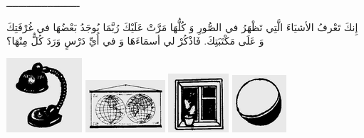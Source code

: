 \documentclass[a5paper]{article}
\begin{document}
ـــــــــــــــــــــــــ

إِنكَ تَعْرفُ الأشيَاءَ الَّتِي تَظْهَرُ في الصُّورِ وَ كُلُّهَا مَرَّتْ عَلَيْكَ رُبَّمَا يُوجَدُ بَعْضُهَا في غُرْفَتِكَ وَ عَلَى مَكْتَبَتِكَ. فَاذْكُرْ لي أسمَاءَهَا وَ في أَيِّ دَرْسٍ وَرَدَ كُلٌّ مِنْهَا؟

 \includegraphics[width=1.1043in,height=1.0937in]{MuhammadBagauddinlatinized-img311.png}   \includegraphics[width=1.1665in,height=0.7709in]{MuhammadBagauddinlatinized-img312.png}   \includegraphics[width=0.8854in,height=0.8646in]{MuhammadBagauddinlatinized-img313.png}   \includegraphics[width=0.7917in,height=0.8437in]{MuhammadBagauddinlatinized-img314.png} 
\end{document}
